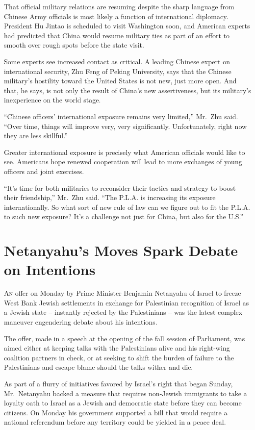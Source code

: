 ﻿\documentclass[12pt]{article}
\begin{document}
That official military relations are resuming despite the sharp language from Chinese Army officials
is most likely a function of international diplomacy. President Hu Jintao is scheduled to visit
Washington soon, and American experts had predicted that China would resume military ties as part of
an effort to smooth over rough spots before the state visit.

Some experts see increased contact as critical. A leading Chinese expert on international security,
Zhu Feng of Peking University, says that the Chinese military's hostility toward the United States
is not new, just more open. And that, he says, is not only the result of China's new assertiveness,
but its military's inexperience on the world stage.

``Chinese officers' international exposure remains very limited,'' Mr.~Zhu said. ``Over time, things
will improve very, very significantly. Unfortunately, right now they are less skillful.''

Greater international exposure is precisely what American officials would like to see. Americans
hope renewed cooperation will lead to more exchanges of young officers and joint exercises.

``It's time for both militaries to reconsider their tactics and strategy to boost their
friendship,'' Mr.~Zhu said. ``The P.L.A. is increasing its exposure internationally. So what sort of
new rule of law can we figure out to fit the P.L.A. to such new exposure? It's a challenge not just
for China, but also for the U.S.''

\section{Netanyahu's Moves Spark Debate on Intentions}

\lettrine{A}{n} offer on Monday by Prime Minister Benjamin Netanyahu of
Israel to freeze West Bank Jewish settlements in exchange for Palestinian recognition of Israel as a
Jewish state -- instantly rejected by the Palestinians -- was the latest complex maneuver
engendering debate about his intentions.

The offer, made in a speech at the opening of the fall session of Parliament, was aimed either at
keeping talks with the Palestinians alive and his right-wing coalition partners in check, or at
seeking to shift the burden of failure to the Palestinians and escape blame should the talks wither
and die.

As part of a flurry of initiatives favored by Israel's right that began Sunday, Mr.~Netanyahu backed
a measure that requires non-Jewish immigrants to take a loyalty oath to Israel as a Jewish and
democratic state before they can become citizens. On Monday his government supported a bill that
would require a national referendum before any territory could be yielded in a peace deal.
\end{document}
